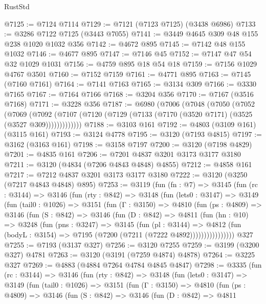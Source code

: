 \begin{lexlean}{RustStd}
\begin{coremodule}
@7125 := @7124 @7114
@7129 := @7121 (@7123 @7125) (@3438 @6986)
@7133 := @3286 @7122 @7125 (@3443 @7055)
@7141 := @3449 @4645 @309 @48 @155 @238 @1020 @1032 @356
@7142 := @4672 @895
@7145 := @7142 @48 @155 @1032
@7146 := @4677 @895
@7147 := @7146 @45
@7152 := @7147 @47 @54 @32 @1029 @1031
@7156 := @4759 @895 @18 @54 @18
@7159 := @7156 @1029 @4767 @3501
@7160 := @7152 @7159
@7161 := @4771 @895
@7163 := @7145 (@7160 @7161)
@7164 := @7141 @7163
@7165 := @3134 @309
@7166 := @3330 @7165
@7167 := @7164 @7166
@7168 := @3204 @356
@7170 := @7167 (@3516 @7168)
@7171 := @3228 @356
@7187 := @6980
    (@7006
      (@7048
        (@7050
          (@7052
            (@7069
              (@7092
                (@7107 (@7120 (@7129 (@7133 (@7170 (@3520 @7171) (@3525 (@3527 @309)))))))))))))
@7188 := @3103 @161
@7192 := @4803 (@3109 @161) (@3115 @161)
@7193 := @3124 @4778
@7195 := @3120 (@7193 @4815)
@7197 := @3162 (@3163 @161)
@7198 := @3158 @7197
@7200 := @3120 (@7198 @4829)
@7201 := @4835 @161
@7206 := @7201 @4837 @3201 @3173 @3177 @3180
@7211 := @3120 (@4834 (@7206 @4843 @4848) @4855)
@7212 := @4858 @161
@7217 := @7212 @4837 @3201 @3173 @3177 @3180
@7222 := @3120 (@3250 (@7217 @4843 @4848) @895)
@7253 := @3119
    (fun (fn : @7) =>
    @3145
      (fun (rc : @3144) =>
      @3146
        (fun (rty : @842) =>
        @3148
          (fun (lets0 : @3147) =>
          @3149
            (fun (tail0 : @1026) =>
            @3151
              (fun (Γ : @3150) =>
              @4810
                (fun (ps : @4809) =>
                @3146
                  (fun (S : @842) =>
                  @3146
                    (fun (D : @842) =>
                    @4811
                      (fun (hn : @10) =>
                      @3248
                        (fun (pns : @3247) =>
                        @3145
                          (fun (pl : @3144) =>
                          @4812
                            (fun (bodyL : @3154) => @7195 (@7200 (@7211 (@7222 @4892))))))))))))))))
    @327
@7255 := @7193 (@3137 @327)
@7256 := @3120 @7255
@7259 := @3199 (@3200 @327) @4781
@7263 := @3120 (@3191 (@7259 @4874) @4878)
@7264 := @3225 @327
@7269 := @4883 (@4884 @7264 @4784 @4845 @4847)
@7298 := @3335
    (fun (rc : @3144) =>
    @3146
      (fun (rty : @842) =>
      @3148
        (fun (lets0 : @3147) =>
        @3149
          (fun (tail0 : @1026) =>
          @3151
            (fun (Γ : @3150) =>
            @4810
              (fun (ps : @4809) =>
              @3146
                (fun (S : @842) =>
                @3146
                  (fun (D : @842) =>
                  @4811

\end{coremodule}
\end{lexlean}
